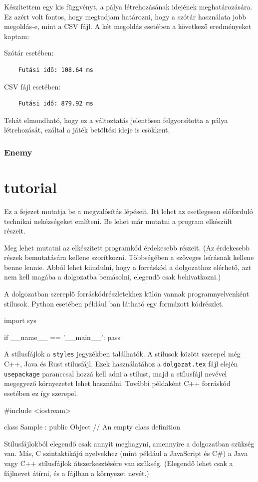 Készítettem egy kis függvényt, a pálya létrehozásának idejének meghatározására. Ez azért volt fontos, hogy megtudjam határozni, hogy a szótár használata jobb megoldás-e, mint a CSV fájl. A két megoldás esetében a következő eredményeket kaptam:

Szótár esetében:
\begin{verbatim}
    Futási idő: 108.64 ms
\end{verbatim}
CSV fájl esetében:
\begin{verbatim}
    Futási idő: 879.92 ms
\end{verbatim}

Tehát elmondható, hogy ez a változtatás jelentősen felgyorsította a pálya létrehozását, ezáltal a játék betöltési ideje is csökkent.

\subsection{Enemy}


\chapter{tutorial}



Ez a fejezet mutatja be a megvalósítás lépéseit.
Itt lehet az esetlegesen előforduló technikai nehézségeket említeni.
Be lehet már mutatni a program elkészült részeit.

Meg lehet mutatni az elkészített programkód érdekesebb részeit.
(Az érdekesebb részek bemutatására kellene szorítkozni.
Többségében a szöveges leírásnak kellene benne lennie.
Abból lehet kiindulni, hogy a forráskód a dolgozathoz elérhető, azt nem kell magába a dolgozatba bemásolni, elegendő csak behivatkozni.)

A dolgozatban szereplő forráskódrészletekhez külön vannak programnyelvenként stílusok.
Python esetében például ban látható egy formázott kódrészlet.
\begin{python}[caption={Python példa},label=py:test]
    import sys
    
    if __name__ == '__main__':
    pass
\end{python}

A stílusfájlok a \texttt{styles} jegyzékben találhatók.
A stílusok között szerepel még C++, Java és Rust stílusfájl.
Ezek használatához a \texttt{dolgozat.tex} fájl elején \texttt{usepackage} paranccsal hozzá kell adni a stílust, majd a stílusfájl nevével megegyező környezetet lehet használni.
További példaként C++ forráskód esetében ez így szerepel.
\begin{cpp}
    #include <iostream>
    
class Sample : public Object
{
    // An empty class definition
    }
\end{cpp}
Stílusfájlokból elegendő csak annyit meghagyni, amennyire a dolgozatban szükség van.
Más, C szintaktikájú nyelvekhez (mint például a JavaScript és C\#) a Java vagy C++ stílusfájlok átszerkesztésére van szükség.
(Elegendő lehet csak a fájlnevet átírni, és a fájlban a környezet nevét.)


